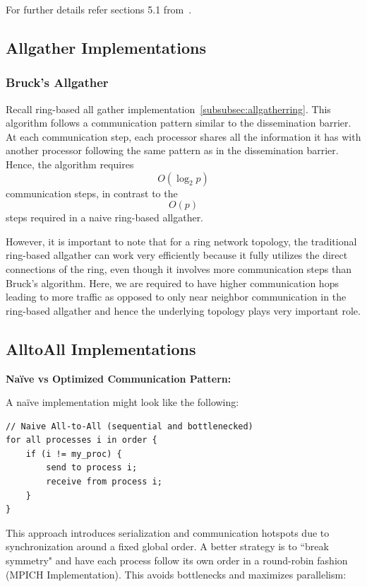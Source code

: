 \documentclass[12pt]{book}
\begin{document}
For further details refer sections 5.1 from~\cite{quinn1994parallel}.
\subsection{Allgather Implementations}
\subsubsection{Bruck's Allgather}

Recall ring-based all gather implementation~\ref{subsubsec:allgatherring}. This algorithm follows a communication pattern similar to the dissemination barrier. At each communication step, each processor shares all the information it has with another processor following the same pattern as in the dissemination barrier. 
Hence, the algorithm requires 
\[
O(\log_2 p)
\]
communication steps, in contrast to the 
\[
O(p)
\]
steps required in a naive ring-based allgather.

However, it is important to note that for a ring network topology, the traditional ring-based allgather can work very efficiently because it fully utilizes the direct connections of the ring, even though it involves more communication steps 
than Bruck's algorithm. Here, we are required to have higher communication hops leading to more traffic as opposed to only near neighbor communication in the ring-based allgather and hence the underlying topology plays very important role.

\subsection{AlltoAll Implementations}
\textbf{Naïve vs Optimized Communication Pattern:}

A naïve implementation might look like the following:

\begin{lstlisting}[style=cppstyle]
// Naive All-to-All (sequential and bottlenecked)
for all processes i in order {
    if (i != my_proc) {
        send to process i;
        receive from process i;
    }
}
\end{lstlisting}

This approach introduces serialization and communication hotspots due to synchronization around a fixed global order. A better strategy is to ``break symmetry" and have each process follow its own order in a round-robin fashion (MPICH Implementation). This avoids bottlenecks and maximizes parallelism:
\end{document}
